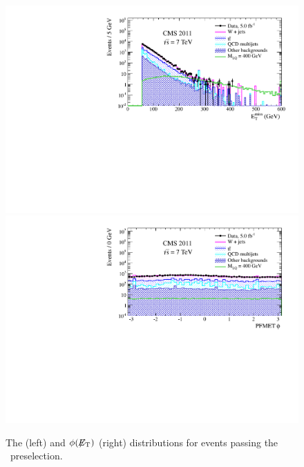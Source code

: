 \begin{figure}[htbp]
  \begin{center}
    {\includegraphics[width=.45\textwidth]{tex/analysis/event_selection/fig/enu/preselection/MET_PAS_enujj_WZSherpa_noNSigma.pdf}}
    {\includegraphics[width=.45\textwidth]{tex/analysis/event_selection/fig/enu/preselection/METPhi_PAS_enujj_WZSherpa_noNSigma.pdf}}
    \caption{
      The \MET (left) and $\phi(\not\!\!{E_{\text{T}}})$ (right) distributions for events passing the \enujj~preselection.
    }
    \label{fig:enujj_preselection_met}
  \end{center}
\end{figure}

